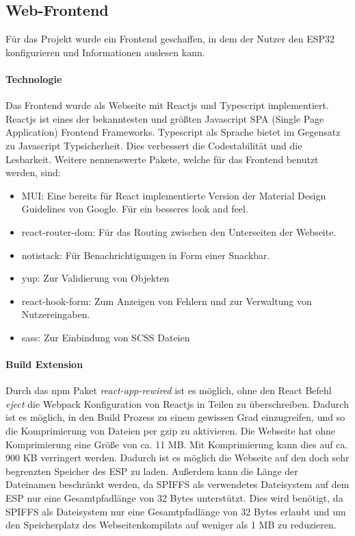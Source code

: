 \subsection{Web-Frontend}\label{Frontend}
Für das Projekt wurde ein Frontend geschaffen, in dem der Nutzer den ESP32 konfigurieren und Informationen auslesen kann.

\paragraph{Technologie}
Das Frontend wurde als Webseite mit Reactjs und Typescript implementiert.
Reactjs ist eines der bekanntesten und größten Javascript SPA (Single Page Application) Frontend Frameworks.
Typescript als Sprache bietet im Gegensatz zu Javascript Typsicherheit.
Dies verbessert die Codestabilität und die Lesbarkeit.
Weitere nennenswerte Pakete, welche für das Frontend benutzt werden, sind:
\begin{itemize}
    \item MUI: Eine bereits für React implementierte Version der Material Design Guidelines von Google. Für ein besseres \glqq look and feel\grqq.
    \item react-router-dom: Für das Routing zwischen den Unterseiten der Webseite.
    \item notistack: Für Benachrichtigungen in Form einer Snackbar.
    \item yup: Zur Validierung von Objekten
    \item react-hook-form: Zum Anzeigen von Fehlern und zur Verwaltung von Nutzereingaben.
    \item sass: Zur Einbindung von SCSS Dateien
\end{itemize}

\paragraph{Build Extension}
Durch das npm Paket \emph{react-app-rewired} ist es möglich, ohne den React Befehl \emph{eject} die Webpack Konfiguration von Reactjs in Teilen zu überschreiben.
Dadurch ist es möglich, in den Build Prozess zu einem gewissen Grad einzugreifen, und so die Komprimierung von Dateien per gzip zu aktivieren. Die Webseite hat ohne Komprimierung eine Größe von ca. 11 MB. Mit Komprimierung kann dies auf ca. 900 KB verringert werden. Dadurch ist es möglich die Webseite auf den doch sehr begrenzten Speicher des ESP zu laden.
Außerdem kann die Länge der Dateinamen beschränkt werden, da SPIFFS als verwendetes Dateisystem auf dem ESP nur eine Gesamtpfadlänge von 32 Bytes unterstützt.
Dies wird benötigt, da SPIFFS als Dateisystem nur eine Gesamtpfadlänge von 32 Bytes erlaubt und um den Speicherplatz des Webseitenkompilats auf weniger als 1 MB zu reduzieren.

